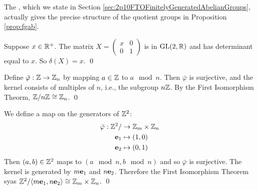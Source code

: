 \documentclass[../algebraNotesMSRI-UP2016.tex]{subfiles}
\begin{document}
\begin{frame}[c]
The , which we state in Section \ref{sec:2p10FTOFinitelyGeneratedAbelianGroups}, actually gives the precise structure of the quotient groups in Proposition \ref{prop:fgab}.
\end{frame}

\answerKey
\begin{frame}[c]{\subsecname}
Suppose $x\in \mathbb R^+$.  The matrix $X=\left(\begin{smallmatrix} x & 0 \\ 0 & 1 \end{smallmatrix}\right)$ is in $\operatorname{GL}(2,\mathbb R)$ and has determinant equal to $x$.  So $\delta(X)=x$.
\qed

\smallGap
{}
Define $\bar{\varphi}: \mathbb Z\to \mathbb Z_n$ by mapping $a\in \mathbb Z$ to $a\mod n$.  Then $\bar{\varphi}$ is surjective, and the kernel consists of multiples of $n$, i.e., the subgroup $n\mathbb Z$.  By the First Isomorphism Theorm, $\mathbb Z/n\mathbb Z\cong \mathbb Z_n$.
\qed
\end{frame}

\begin{frame}[c]
%
{}
We define a map on the generators of $\mathbb Z^2$:
\begin{align*}
\bar{\varphi}: \mathbb Z^2/ &\to \mathbb Z_m\times \mathbb Z_n \\
\mathbf e_1 &\mapsto (1,0) \\
\mathbf e_2 &\mapsto (0,1) 
\end{align*}
Then $(a,b)\in \mathbb Z^2$ maps to $(a\mod n,b\mod n)$ and so $\bar{\varphi}$ is surjective.  The kernel is generated by $m\mathbf e_1$ and $n\mathbf e_2$.  Therefore the First Isomorphism Theorem syas $\mathbb Z^2/\langle m\mathbf e_1,n\mathbf e_2\rangle\cong \mathbb Z_m\times \mathbb Z_n$.
\qed
\end{frame}

\end{document}
